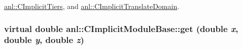 \hyperlink{classanl_1_1CImplicitTiers_a7bb007d1a541d37b5d48027a932f4117}{anl::CImplicitTiers}, and \hyperlink{classanl_1_1CImplicitTranslateDomain_a4c5022a45953ac556e169e2186bf9105}{anl::CImplicitTranslateDomain}.\hypertarget{classanl_1_1CImplicitModuleBase_ac17d592612c82ba3d47f9229a00b1fe3}{
\subsubsection[{get}]{\setlength{\rightskip}{0pt plus 5cm}virtual double anl::CImplicitModuleBase::get (double {\em x}, \/  double {\em y}, \/  double {\em z})}}
\label{classanl_1_1CImplicitModuleBase_ac17d592612c82ba3d47f9229a00b1fe3}


